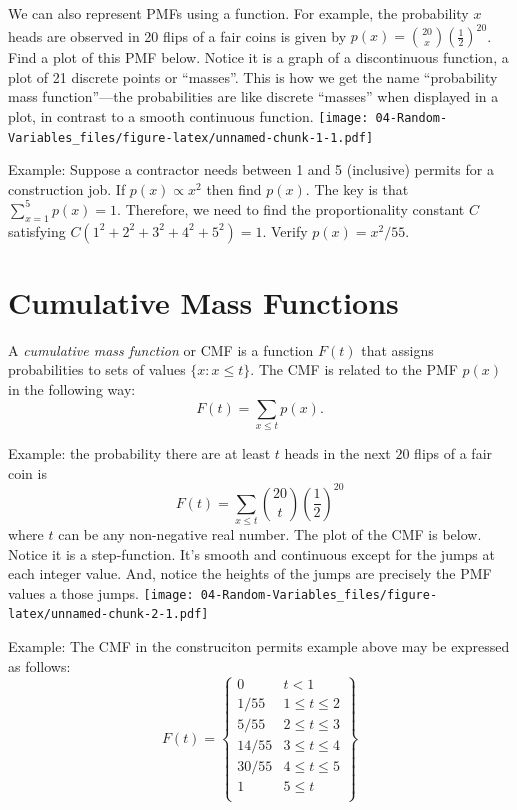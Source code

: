 \documentclass[]{book}
\begin{document}
We can also represent PMFs using a function. For example, the
probability \(x\) heads are observed in 20 flips of a fair coins is
given by \(p(x) = {20 \choose x}(\frac{1}{2})^{20}\). Find a plot of
this PMF below. Notice it is a graph of a discontinuous function, a plot
of 21 discrete points or ``masses''. This is how we get the name
``probability mass function''---the probabilities are like discrete
``masses'' when displayed in a plot, in contrast to a smooth continuous
function.
\texttt{[image: 04-Random-Variables\_files/figure-latex/unnamed-chunk-1-1.pdf]}

Example: Suppose a contractor needs between 1 and 5 (inclusive) permits
for a construction job. If \(p(x)\propto x^2\) then find \(p(x)\). The
key is that \(\sum_{x=1}^5 p(x) = 1\). Therefore, we need to find the
proportionality constant \(C\) satisfying
\(C(1^2+2^2+3^2+4^2+5^2) = 1\). Verify \(p(x) = x^2 / 55\).

\section{Cumulative Mass Functions}\label{cumulative-mass-functions}

A \emph{cumulative mass function} or CMF is a function \(F(t)\) that
assigns probabilities to sets of values \(\{x: x\leq t\}\). The CMF is
related to the PMF \(p(x)\) in the following way:
\[F(t) = \sum_{x\leq t} p(x).\]

Example: the probability there are at least \(t\) heads in the next
\(20\) flips of a fair coin is
\[F(t) = \sum_{x\leq t} {20 \choose t}\left(\frac{1}{2}\right)^{20}\]
where \(t\) can be any non-negative real number. The plot of the CMF is
below. Notice it is a step-function. It's smooth and continuous except
for the jumps at each integer value. And, notice the heights of the
jumps are precisely the PMF values a those jumps.
\texttt{[image: 04-Random-Variables\_files/figure-latex/unnamed-chunk-2-1.pdf]}

Example: The CMF in the construciton permits example above may be
expressed as follows: \[F(t) =\left\{ \begin{matrix} 
0  & t < 1 \\ 
1/55 & 1\leq t\leq 2 \\ 
5/55 & 2\leq t\leq 3 \\
14/55 & 3\leq t\leq 4 \\
30/55 & 4\leq t\leq 5 \\
1 & 5\leq t \\
\end{matrix}\right\}   \]
\end{document}
